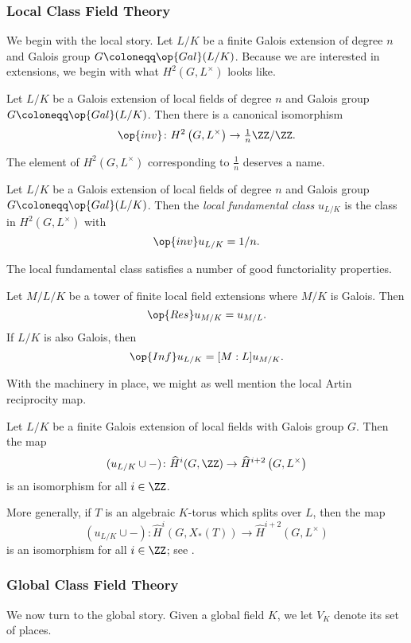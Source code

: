 \subsubsection{Local Class Field Theory}
We begin with the local story. Let $L/K$ be a finite Galois extension of  degree $n$ and Galois group $G\coloneqq\op{Gal}(L/K)$. Because we are interested in extensions, we begin with what $H^2\left(G,L^\times\right)$ looks like.
\begin{theorem}
	Let $L/K$ be a Galois extension of local fields of degree $n$ and Galois group $G\coloneqq\op{Gal}(L/K)$. Then there is a canonical isomorphism
	\[\op{inv}\colon H^2\left(G,L^\times\right)\to{\textstyle\frac1n}\ZZ/\ZZ.\]
\end{theorem}
The element of $H^2(G,L^\times)$ corresponding to $\frac1n$ deserves a name.
\begin{definition}
	Let $L/K$ be a Galois extension of local fields of degree $n$ and Galois group $G\coloneqq\op{Gal}(L/K)$. Then the \textit{local fundamental class} $u_{L/K}$ is the class in $H^2\left(G,L^\times\right)$ with
	\[\op{inv}u_{L/K}=1/n.\]
\end{definition}
The local fundamental class satisfies a number of good functoriality properties.
\begin{proposition} \label{prop:functorialfundclass}
	Let $M/L/K$ be a tower of finite local field extensions where $M/K$ is Galois. Then
	\[\op{Res}u_{M/K}=u_{M/L}.\]
	If $L/K$ is also Galois, then
	\[\op{Inf}u_{L/K}=[M:L]u_{M/K}.\]
\end{proposition}
With the machinery in place, we might as well mention the local Artin reciprocity map.
\begin{theorem}
	Let $L/K$ be a finite Galois extension of local fields with Galois group $G$. Then the map
	\[(u_{L/K}\cup-)\colon\widehat H^i(G,\ZZ)\to\widehat H^{i+2}\left(G,L^\times\right)\]
	is an isomorphism for all $i\in\ZZ$.
\end{theorem}
\begin{remark}
	More generally, if $T$ is an algebraic $K$-torus which splits over $L$, then the map
	\[(u_{L/K}\cup-)\colon\widehat H^i(G,X_*(T))\to\widehat H^{i+2}\left(G,L^\times\right)\]
	is an isomorphism for all $i\in\ZZ$; see \cite[Theorem~6.2]{alg-tori}.
\end{remark}

\subsubsection{Global Class Field Theory}
We now turn to the global story. Given a global field $K$, we let $V_K$ denote its set of places.

